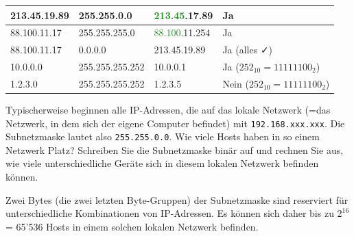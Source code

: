 \begin{myexercise}
\begin{myanswer}
\begin{table}[H]
\begin{tabular}{l|l|l|l}
				213.45.19.89       & 255.255.0.0        & \textcolor{ForestGreen}{213.45}.17.89  & Ja                                  \\\midrule

				88.100.11.17       & 255.255.255.0      & \textcolor{ForestGreen}{88.100}.11.254 & Ja                                  \\\midrule

				88.100.11.17       & 0.0.0.0            & 213.45.19.89                     & Ja (alles \faCheck)                 \\\midrule

				10.0.0.0           & 255.255.255.252    & 10.0.0.1                         & Ja ($252_{10}=11111100_{2}$)        \\\midrule
				1.2.3.0            & 255.255.255.252    & 1.2.3.5                          & Nein ($252_{10}=11111100_{2}$)
			\end{tabular}
		\end{table}
	\end{myanswer}
\end{myexercise}

\begin{myexercise}
	Typischerweise beginnen alle IP-Adressen, die auf das lokale Netzwerk (=das Netzwerk, in dem sich der eigene Computer befindet) mit \texttt{192.168.xxx.xxx}. Die Subnetzmaske lautet also \texttt{255.255.0.0}. Wie viele Hosts haben in so einem Netzwerk Platz? Schreiben Sie die Subnetzmaske binär auf und rechnen Sie aus, wie viele unterschiedliche Geräte sich in diesem lokalen Netzwerk befinden können.
	\begin{myanswer}
		Zwei Bytes (die zwei letzten Byte-Gruppen) der Subnetzmaske sind reserviert für unterschiedliche Kombinationen von \gls{IP}-Adressen. Es können sich daher bis zu $2^{16}$ = 65'536 Hosts in einem solchen lokalen Netzwerk befinden.
	\end{myanswer}
\end{myexercise}

